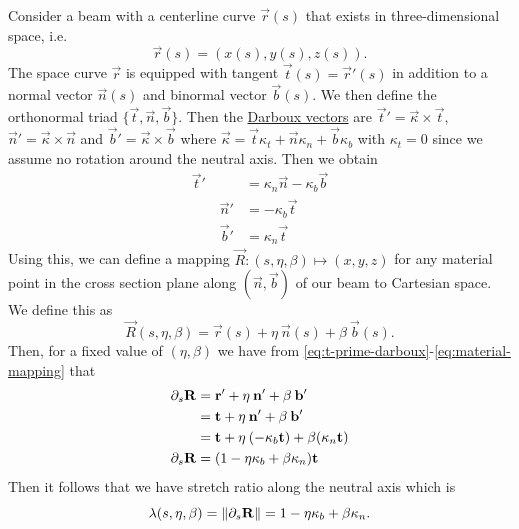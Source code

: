 Consider a beam with a centerline curve \(\vec r(s)\) that exists in
three-dimensional space, i.e.
\begin{equation*}
	\vec r (s) = (x(s),y(s),z(s)).
\end{equation*}
The space curve \(\vec r\) is equipped with tangent \(\vec t(s) = \vec r'(s)\) in addition to a normal vector \(\vec n(s)\) and binormal vector \(\vec b(s)\). We then define the orthonormal triad \(\{\vec t, \vec n, \vec b\}\). Then the \href{https://en.wikipedia.org/wiki/Darboux_vector}{Darboux vectors} are \(\vec t ' = \vec \kappa \times \vec t \), \(\vec n ' = \vec \kappa \times \vec n\) and \(\vec b ' = \vec \kappa \times \vec b\) where \(\vec \kappa = \vec t \kappa_t + \vec n \kappa_n + \vec b \kappa_b \) with \(\kappa_t = 0\) since we assume no rotation around the neutral axis. Then we obtain
\begin{align}
	\vec t'        & = \kappa_n \vec n - \kappa_b \vec b \label{eq:t-prime-darboux} \\
	\qquad \vec n' & = -\kappa_b \vec t \label{eq:n-prime-darboux}                  \\
	\qquad \vec b' & = \kappa_n \vec t \label{eq:b-prime-darboux}
\end{align}
Using this, we can define a mapping \(\vec{R} : (s,\eta,\beta) \mapsto (x,y,z)\) for any material point in the cross section plane along \((\vec n, \vec b)\) of our beam to Cartesian space. We define this as
\begin{equation}\label{eq:material-mapping}
	\vec R (s,\eta, \beta) = \vec r (s) + \eta \: \vec n(s) + \beta \:\vec b(s).
\end{equation}
Then, for a fixed value of \((\eta, \beta)\) we have from \eqref{eq:t-prime-darboux}-\eqref{eq:material-mapping} that
\begin{align*}
	\pdif{s} \vec R & = \vec r' + \eta \: \vec n' + \beta \: \vec b'                  \\
	                & = \vec t + \eta \: \vec n' + \beta \: \vec b'                   \\
	                & = \vec t + \eta \: (-\kappa_b \vec t) + \beta (\kappa_n \vec t) \\
	\pdif{s} \vec R & = (1 - \eta \kappa_b + \beta \kappa_n) \vec t
\end{align*}
Then it follows that we have stretch ratio along the neutral axis which is
\begin{equation*}
	\lambda(s,\eta,\beta) = \norm{ \pdif{s} \vec R } = 1 - \eta \kappa_b + \beta \kappa_n.
\end{equation*}
